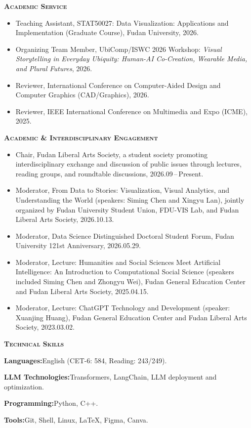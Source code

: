 \documentclass[10pt,a4paper]{article}
\newcommand{\bodyfont}{\fontsize{10.4pt}{13.35pt}\selectfont}
\newcommand{\cvsection}[1]{%
  \Needspace{2.6\baselineskip}%
  \vspace{9pt}%
  {\fontsize{11.6pt}{13.8pt}\selectfont\bfseries\scshape #1}\par
  \vspace{\dimexpr-\baselineskip+2.8pt\relax}%
  \noindent{\color{CVRule}\rule{\textwidth}{0.32pt}}\par
  \vspace{5pt}%
}
\newenvironment{cvitems}{%
  \begin{itemize}[leftmargin=1.22em,labelsep=0.42em,itemsep=2.35pt,topsep=0.15pt,parsep=0pt,partopsep=0pt]
  \bodyfont
}{\end{itemize}}
\newcommand{\skillline}[2]{%
  \textbf{#1}\hspace{0.5em}#2\par\vspace{2.35pt}%
}
\begin{document}
\cvsection{Academic Service}
\begin{cvitems}
  \item Teaching Assistant, STAT50027: Data Visualization: Applications and Implementation (Graduate Course), Fudan University, 2026.
  \item Organizing Team Member, UbiComp/ISWC 2026 Workshop: \textit{Visual Storytelling in Everyday Ubiquity: Human-AI Co-Creation, Wearable Media, and Plural Futures}, 2026.
  \item Reviewer, International Conference on Computer-Aided Design and Computer Graphics (CAD/Graphics), 2026.
  \item Reviewer, IEEE International Conference on Multimedia and Expo (ICME), 2025.
\end{cvitems}

\cvsection{Academic \& Interdisciplinary Engagement}
\begin{cvitems}
  \item Chair, Fudan Liberal Arts Society, a student society promoting interdisciplinary exchange and discussion of public issues through lectures, reading groups, and roundtable discussions, \mbox{2026.09\,--\,Present}.
  \item Moderator, From Data to Stories: Visualization, Visual Analytics, and Understanding the World (speakers: Siming Chen and Xingyu Lan), jointly organized by Fudan University Student Union, FDU-VIS Lab, and Fudan Liberal Arts Society, 2026.10.13.
  \item Moderator, Data Science Distinguished Doctoral Student Forum, Fudan University 121st Anniversary, 2026.05.29.
  \item Moderator, Lecture: Humanities and Social Sciences Meet Artificial Intelligence: An Introduction to Computational Social Science (speakers included Siming Chen and Zhongyu Wei), Fudan General Education Center and Fudan Liberal Arts Society, 2025.04.15.
  \item Moderator, Lecture: ChatGPT Technology and Development (speaker: Xuanjing Huang), Fudan General Education Center and Fudan Liberal Arts Society, 2023.03.02.
\end{cvitems}

\cvsection{Technical Skills}
\skillline{Languages:}{English (CET-6: 584, Reading: 243/249).}
\skillline{LLM Technologies:}{Transformers, LangChain, LLM deployment and optimization.}
\skillline{Programming:}{Python, C++.}
\skillline{Tools:}{Git, Shell, Linux, \LaTeX, Figma, Canva.}

\label{cvlastpage}
\end{document}
